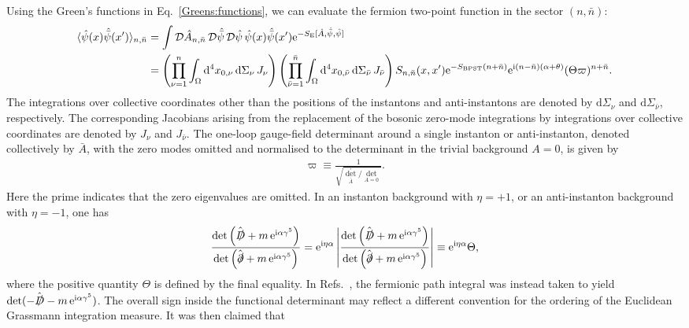 \documentclass[review]{elsarticle}
\numberwithin{equation}{section}
\numberwithin{table}{section}
\numberwithin{figure}{section}
\def\d{\mathrm{d}}
\def\i{\mathrm{i}}
\def\e{\mathrm{e}}
\begin{document}
Using the Green's functions in Eq.~\eqref{Greens:functions}, we can evaluate the fermion two-point function in the sector $(n,\bar n)$:
\begin{align}
    \langle \hat\psi(x)\hat{\bar\psi}(x^\prime)\rangle_{n,\bar n} 
    &= 
    \int\mathcal{D}\hat A_{n,\bar n}\,\mathcal{D}\hat{\bar\psi}\,\mathcal{D}\hat{\psi}\,\hat\psi(x)\hat{\bar\psi}(x^\prime)\e^{-S_{\rm E}[\hat{A},\hat{\bar\psi},\hat{\psi}]}\notag\\
    &= 
    \left(\prod_{\nu=1}^{n}\int_{\Omega}\d^4x_{0,\nu}\,\d\Sigma_\nu\, J_\nu\right)\left(\prod_{\bar\nu=1}^{\bar n} \int_{\Omega}\d^4x_{0,\bar\nu}\,\d\Sigma_{\bar\nu}\,J_{\bar\nu} \right)S_{n,\bar n}(x,x^\prime) \e^{-S_{\rm BPST}(n+\bar n)} \e^{\i(n-\bar n)(\alpha+\theta)} (\Theta\varpi)^{n+\bar n}. \label{eq:psibarpsi-nbarn}
\end{align}
The integrations over collective coordinates other than the positions of the instantons and anti-instantons are denoted by $\d\Sigma_{\nu}$ and $\d\Sigma_{\bar\nu}$, respectively. The corresponding Jacobians arising from the replacement of the bosonic zero-mode integrations by integrations over collective coordinates are denoted by $J_\nu$ and $J_{\bar\nu}$. The one-loop gauge-field determinant around a single instanton or anti-instanton, denoted collectively by $\bar A$, with the zero modes omitted and normalised to the determinant in the trivial background $A=0$, is given by
\begin{align}
    \varpi\equiv\frac{1}{\sqrt{\det_{\bar A}^{\prime}/\det_{A=0}}}. \label{eq:varpidef}
\end{align}
Here the prime indicates that the zero eigenvalues are omitted. In an instanton background with $\eta=+1$, or an anti-instanton background with $\eta=-1$, one has~\cite{Ai:2020ptm}
\begin{align}
    \frac{\det\left( \hat{\slashed{D}}+m\,\e^{\i\alpha\gamma^5}\right)}{\det\left(\hat{\slashed{\partial}}+ m\,\e^{\i\alpha\gamma^5}\right)} 
    =
    \e^{\i\eta\alpha}\left|\frac{\det\left(\hat{\slashed{D}} +m\,\e^{\i\alpha\gamma^5}\right)}{\det\left(\hat{\slashed{\partial}} +m\,\e^{\i\alpha\gamma^5} \right)}\right|\equiv\e^{\i\eta\alpha}\Theta,
    \label{eq:fermion-determinant-ratio}
\end{align}
where the positive quantity $\Theta$ is defined by the final equality. In Refs.~\cite{Ai:2020ptm,Ai:2024cnp}, the fermionic path integral was instead taken to yield $\det(-\hat{\slashed{D}}-m\,\e^{\i\alpha\gamma^5})$. The overall sign inside the functional determinant may reflect a different convention for the ordering of the Euclidean Grassmann integration measure. It was then claimed that
\end{document}
